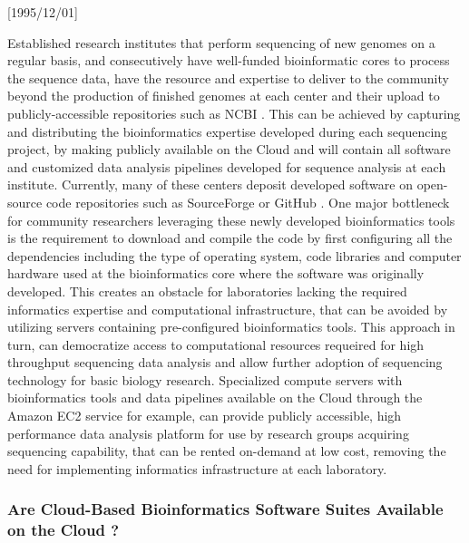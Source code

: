 \NeedsTeXFormat{LaTeX2e}[1995/12/01] \documentclass[10pt]{bmc_article}
\newenvironment{bmcformat}{\begin{raggedright}\baselineskip20pt\sloppy\setboolean{publ}{false}}{\end{raggedright}\baselineskip20pt\sloppy}
\begin{document}
\begin{bmcformat}
Established research institutes that perform sequencing of new genomes on a regular basis, and consecutively have
well-funded bioinformatic cores to process the sequence data, have the resource and expertise to deliver to the community 
beyond the production of finished genomes at each center and their upload to publicly-accessible repositories such as 
NCBI \cite{}. This can be achieved by capturing and distributing the bioinformatics expertise developed during each
sequencing project, by making publicly available on the Cloud and will contain all software and customized data analysis
pipelines developed for sequence analysis at each institute. Currently, many of these centers deposit developed 
software on open-source code repositories such as SourceForge \cite{sourceforge} or GitHub \cite{github}. One major 
bottleneck for community researchers leveraging these newly developed bioinformatics tools is the requirement to 
download and compile the code by first configuring all the dependencies including the type of operating system, code 
libraries and computer hardware used at the bioinformatics core where the software was originally developed. This 
creates an obstacle for laboratories lacking the required informatics expertise and computational infrastructure, 
that can be avoided by utilizing servers containing pre-configured bioinformatics tools. This approach in turn, can 
democratize access to computational resources requeired for high throughput sequencing data analysis and allow further 
adoption of sequencing technology for basic biology research. Specialized compute servers with bioinformatics tools 
and data pipelines available on the Cloud through the Amazon EC2 service for example, can provide publicly accessible, 
high performance data analysis platform for use by research groups acquiring sequencing capability, that can be rented 
on-demand at low cost, removing the need for implementing informatics infrastructure at each laboratory.  


\subsubsection*{Are Cloud-Based Bioinformatics Software Suites Available on the Cloud ?}
  

\end{bmcformat}
\end{document}
